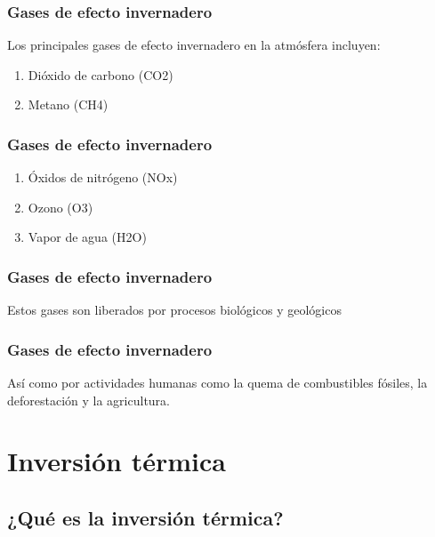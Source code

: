 \documentclass[14pt]{beamer}
\begin{document}
\begin{frame}
\frametitle{Gases de efecto invernadero}
Los principales gases de efecto invernadero en la atmósfera incluyen:
\pause
{}
\begin{enumerate}[<+->]
\item Dióxido de carbono (CO2)
\item Metano (CH4)
\seti
\end{enumerate}
\end{frame}
\begin{frame}
\frametitle{Gases de efecto invernadero}
\begin{enumerate}[<+->]
\conti
\item Óxidos de nitrógeno (NOx)
\item Ozono (O3)
\item Vapor de agua (H2O)
\end{enumerate}
\end{frame}
\begin{frame}
\frametitle{Gases de efecto invernadero}
Estos gases son liberados  por procesos biológicos y geológicos
\end{frame}
\begin{frame}
\frametitle{Gases de efecto invernadero}
Así como por actividades humanas como la quema de combustibles fósiles, la deforestación y la agricultura.
\end{frame}

\section{Inversión térmica}
\subsection{¿Qué es la inversión térmica?}
\end{document}
